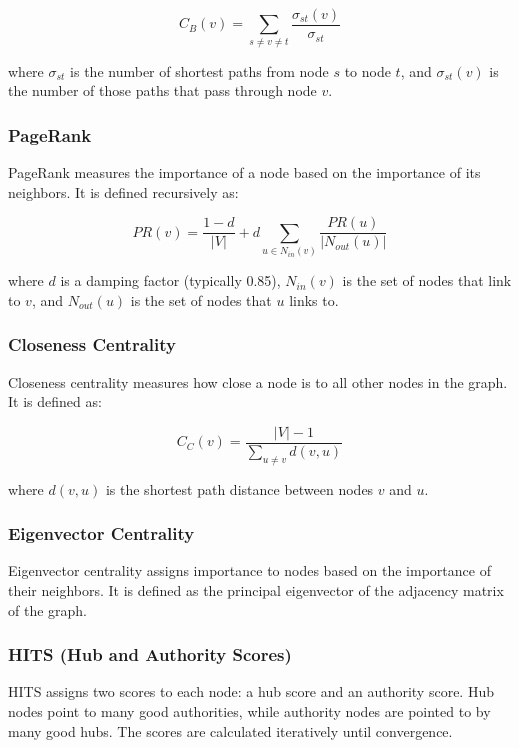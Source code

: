 \documentclass[article,submit,pdftex,moreauthors]{Definitions/mdpi}
\begin{document}
\begin{equation}
C_B(v) = \sum_{s \neq v \neq t} \frac{\sigma_{st}(v)}{\sigma_{st}}
\end{equation}

where $\sigma_{st}$ is the number of shortest paths from node $s$ to node $t$, and $\sigma_{st}(v)$ is the number of those paths that pass through node $v$.

\subsubsection{PageRank}
PageRank measures the importance of a node based on the importance of its neighbors. It is defined recursively as:

\begin{equation}
PR(v) = \frac{1-d}{|V|} + d \sum_{u \in N_{in}(v)} \frac{PR(u)}{|N_{out}(u)|}
\end{equation}

where $d$ is a damping factor (typically 0.85), $N_{in}(v)$ is the set of nodes that link to $v$, and $N_{out}(u)$ is the set of nodes that $u$ links to.

\subsubsection{Closeness Centrality}
Closeness centrality measures how close a node is to all other nodes in the graph. It is defined as:

\begin{equation}
C_C(v) = \frac{|V| - 1}{\sum_{u \neq v} d(v, u)}
\end{equation}

where $d(v, u)$ is the shortest path distance between nodes $v$ and $u$.

\subsubsection{Eigenvector Centrality}
Eigenvector centrality assigns importance to nodes based on the importance of their neighbors. It is defined as the principal eigenvector of the adjacency matrix of the graph.

\subsubsection{HITS (Hub and Authority Scores)}
HITS assigns two scores to each node: a hub score and an authority score. Hub nodes point to many good authorities, while authority nodes are pointed to by many good hubs. The scores are calculated iteratively until convergence.
\end{document}
